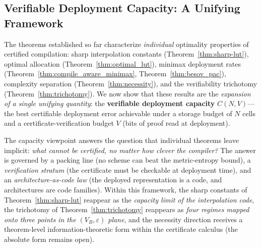 %
%

\subsection{Verifiable Deployment Capacity: A Unifying Framework}
\label{sec:capacity}

The theorems established so far characterize \emph{individual} optimality
properties of certified compilation: sharp interpolation constants
(Theorem~\ref{thm:sharp-lut}), optimal allocation (Theorem~\ref{thm:optimal_lut}),
minimax deployment rates (Theorem~\ref{thm:compile_aware_minimax},
Theorem~\ref{thm:besov_pac}), complexity separation
(Theorem~\ref{thm:necessity}), and the verifiability trichotomy
(Theorem~\ref{thm:trichotomy}). We now show that these results are the
\emph{expansion of a single unifying quantity}: the \textbf{verifiable
deployment capacity} $C(N, V)$---the best certifiable deployment error
achievable under a storage budget of $N$ cells and a
certificate-verification budget $V$ (bits of proof read at deployment).

The capacity viewpoint answers the question that individual theorems
leave implicit: \emph{what cannot be certified, no matter how clever the
compiler?} The answer is governed by a packing line (no scheme can beat
the metric-entropy bound), a \emph{verification stratum} (the certificate
must be checkable at deployment time), and an \emph{architecture-as-code
law} (the deployed representation is a code, and architectures are code
families). Within this framework, the sharp constants of
Theorem~\ref{thm:sharp-lut} reappear as the \emph{capacity limit of the
interpolation code}, the trichotomy of Theorem~\ref{thm:trichotomy}
reappears as \emph{four regimes mapped onto three points in the
$(V_B, \varepsilon)$ plane}, and the necessity direction receives a
theorem-level information-theoretic form within the certificate
calculus (the absolute form remains open).


